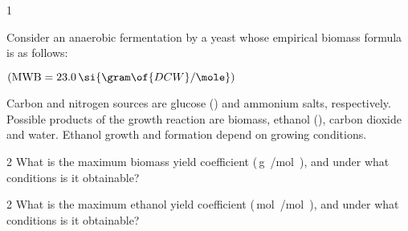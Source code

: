 \documentclass[\mainfilename]{subfiles}
\begin{document}
\begin{questionBox}1{ %
    Consider an anaerobic fermentation by a yeast whose empirical biomass formula is as follows:
    \begin{center}
         \((\text{MWB} = 23.0\,\si{\gram\of{DCW}/\mole})\)
    \end{center}
    Carbon and nitrogen sources are glucose () and ammonium salts, respectively. Possible products of the growth reaction are biomass, ethanol (), carbon dioxide and water. Ethanol growth and formation depend on growing conditions.
} %
    \begin{questionBox}2{ %
        What is the maximum biomass yield coefficient (\,\si{\gram{}/\mole{}}), and under what conditions is it obtainable?
    } %
    \end{questionBox}

    \begin{questionBox}2{ %
        What is the maximum ethanol yield coefficient (\,\si{\mole{}/\mole{}}), and under what conditions is it obtainable?
    } %
    \end{questionBox}
\end{questionBox}

\setcounter{question}{6}
\end{document}
